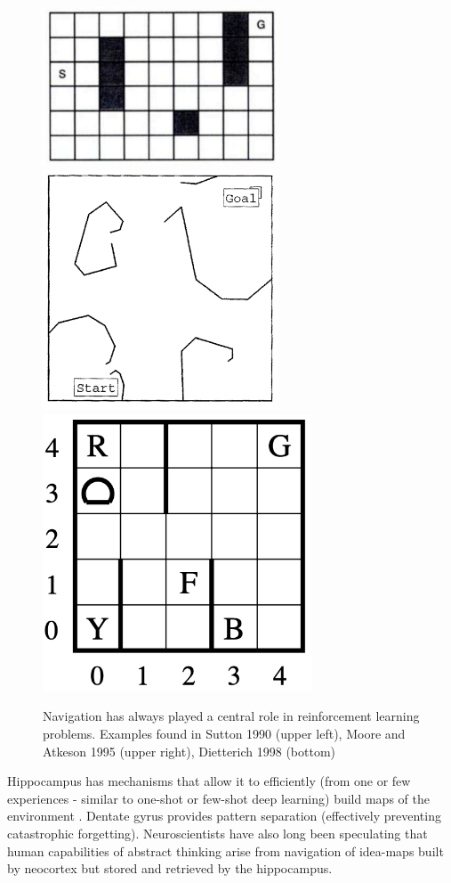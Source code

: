 \documentclass[12pt]{article}
\begin{document}
\begin{figure}[!htbp]
	\includegraphics[width=7cm]{dyna}
	\includegraphics[width=7cm]{parti_game}
	\includegraphics[width=8cm]{maxq}
	\caption{Navigation has always played a central role in reinforcement learning problems. Examples found in Sutton 1990 \cite{dyna} (upper left), Moore and Atkeson 1995 \cite{parti_game} (upper right), Dietterich 1998 \cite{maxq} (bottom) }
	\label{fig:rl_problems}
\end{figure}
Hippocampus has mechanisms that allow it to efficiently (from one or few experiences - similar to one-shot or few-shot deep learning) build maps of the environment \cite{PredictivePlaceCell,space_in_the_brain,model_of_spatial_and_episodic_memory,coding_of_space_and_time}. Dentate gyrus provides pattern separation\cite{Pattern_separation} (effectively preventing catastrophic forgetting). Neuroscientists have also long been speculating that human capabilities of abstract thinking arise from navigation of idea-maps built by neocortex but stored and retrieved by the hippocampus\cite{hippocampal_indexing_theory,Geometry_of_abstract}. 
\end{document}
